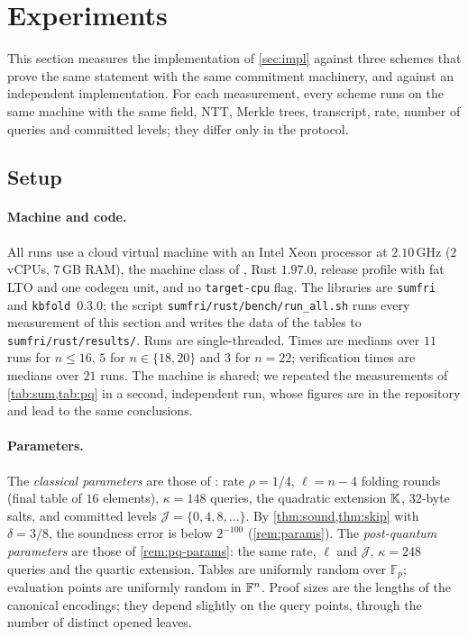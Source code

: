 \section{Experiments}\label{sec:exp}

This section measures the implementation of \cref{sec:impl} against three schemes that prove the same statement with the same commitment machinery, and against an independent implementation.
For each measurement, every scheme runs on the same machine with the same field, NTT, Merkle trees, transcript, rate, number of queries and committed levels; they differ only in the protocol.

\subsection{Setup}\label{sec:exp:setup}

\paragraph{Machine and code.}
All runs use a cloud virtual machine with an Intel Xeon processor at $2.10$\,GHz ($2$ vCPUs, $7$\,GB RAM), the machine class of , Rust $1.97.0$, release profile with fat LTO and one codegen unit, and no \texttt{target-cpu} flag.
The libraries are \texttt{sumfri}~\sfversion{} and \texttt{kbfold}~0.3.0; the script \texttt{sumfri/rust/bench/run\_all.sh} runs every measurement of this section and writes the data of the tables to \texttt{sumfri/rust/results/}.
Runs are single-threaded.
Times are medians over $11$ runs for $n \le 16$, $5$ for $n \in \{18, 20\}$ and $3$ for $n = 22$; verification times are medians over $21$ runs.
The machine is shared; we repeated the measurements of \cref{tab:sum,tab:pq} in a second, independent run, whose figures are in the repository and lead to the same conclusions.

\paragraph{Parameters.}
The \emph{classical parameters} are those of : rate $\rho = 1/4$, $\ell = n - 4$ folding rounds (final table of $16$ elements), $\kappa = 148$ queries, the quadratic extension $\mathbb{K}$, $32$-byte salts, and committed levels $\mathcal{J} = \{0, 4, 8, \dots\}$.
By \cref{thm:sound,thm:skip} with $\delta = 3/8$, the soundness error is below $2^{-100}$ (\cref{rem:params}).
The \emph{post-quantum parameters} are those of \cref{rem:pq-params}: the same rate, $\ell$ and $\mathcal{J}$, $\kappa = 248$ queries and the quartic extension.
Tables are uniformly random over $\mathbb{F}_p$; evaluation points are uniformly random in $\mathbb{F}^n$.
Proof sizes are the lengths of the canonical encodings; they depend slightly on the query points, through the number of distinct opened leaves.

